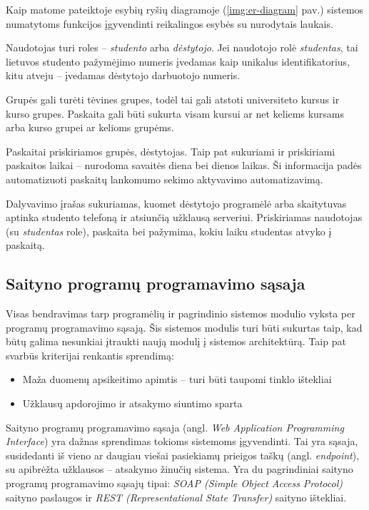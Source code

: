 \documentclass{VUMIFPSkursinis}
\begin{document}
Kaip matome pateiktoje esybių ryšių diagramoje (\ref{img:er-diagram} pav.) sistemos numatytoms funkcijos įgyvendinti reikalingos esybės su nurodytais laukais.

Naudotojas turi roles – \textit{studento} arba \textit{dėstytojo}. Jei naudotojo rolė \textit{studentas}, tai lietuvos studento pažymėjimo numeris įvedamas kaip unikalus identifikatorius, kitu atveju – įvedamas dėstytojo darbuotojo numeris.

Grupės gali turėti tėvines grupes, todėl tai gali atstoti universiteto kursus ir kurso grupes. Paskaita gali būti sukurta visam kursui ar net keliems kursams arba kurso grupei ar kelioms grupėms.

Paskaitai priskiriamos grupės, dėstytojas. Taip pat sukuriami ir priskiriami paskaitos laikai – nurodoma savaitės diena bei dienos laikas. Ši informacija padės automatizuoti paskaitų lankomumo sekimo aktyvavimo automatizavimą.

Dalyvavimo įrašas sukuriamas, kuomet dėstytojo programėlė arba skaitytuvas aptinka studento telefoną ir atsiunčią užklausą serveriui. Priskiriamas naudotojas (su \textit{studentas} role), paskaita bei pažymima, kokiu laiku studentas atvyko į paskaitą.

\subsection{Saityno programų programavimo sąsaja} \label{webApi}

Visas bendravimas tarp programėlių ir pagrindinio sistemos modulio vyksta per programų programavimo sąsają. Šis sistemos modulis turi būti sukurtas taip, kad būtų galima nesunkiai įtraukti naują modulį į sistemos architektūrą. Taip pat svarbūs kriterijai renkantis sprendimą:

\begin{itemize}
	\item Maža duomenų apsikeitimo apimtis – turi būti taupomi tinklo ištekliai
	\item Užklausų apdorojimo ir atsakymo siuntimo sparta
\end{itemize}

Saityno programų programavimo sąsaja (angl. \textit{Web Application Programming Interface}) yra dažnas sprendimas tokioms sistemoms įgyvendinti. Tai yra sąsaja, susidedanti iš vieno ar daugiau viešai pasiekiamų prieigos taškų (angl. \textit{endpoint}), su apibrėžta užklausos – atsakymo žinučių sistema. Yra du pagrindiniai saityno programų programavimo sąsajų tipai: \textit{SOAP (Simple Object Access Protocol)} saityno paslaugos ir \textit{REST (Representational State Transfer)} saityno ištekliai.
\end{document}

